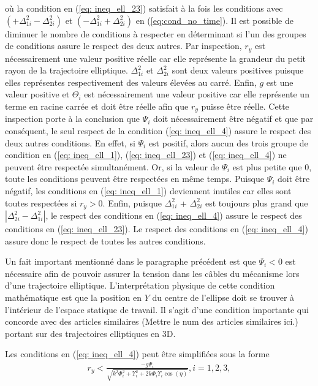 où la condition en (\ref{eq: ineq_ell_23}) satisfait à la fois les conditions avec $\left(+\Delta_{1i}^2 - \Delta_{2i}^2\right)$ et $\left(- \Delta_{1i}^2 + \Delta_{2i}^2\right)$ en (\ref{eq:cond_no_time}). Il est possible de diminuer le nombre de conditions à respecter  en déterminant si l'un des groupes de conditions assure le respect des deux autres. Par inspection, $r_y$ est nécessairement une valeur positive réelle car elle représente la grandeur du petit rayon de la trajectoire elliptique. $\Delta_{1i}^2$ et $\Delta_{2i}^2$ sont deux valeurs positives puisque elles représentes respectivement des valeurs élevées au carré. Enfin, $g$ est une valeur positive et $\Theta_i$ est nécessairement une valeur positive car elle représente un terme en racine carrée et doit être réelle afin que $r_y$ puisse être réelle. Cette inspection porte à la conclusion que $\Psi_i$ doit nécessairement être négatif et que par conséquent, le seul respect de la  condition (\ref{eq: ineq_ell_4}) assure le respect des deux autres conditions. En effet, si $\Psi_i$ est positif, alors aucun des trois groupe de condition en (\ref{eq: ineq_ell_1}), (\ref{eq: ineq_ell_23}) et (\ref{eq: ineq_ell_4}) ne peuvent être respectée simultanément. Or, si la valeur de $\Psi_i$ est plus petite que 0, toute les conditions peuvent être respectées en même temps. Puisque $\Psi_i$ doit être négatif, les conditions en (\ref{eq: ineq_ell_1}) deviennent inutiles car elles sont toutes respectées si $r_y>0$. Enfin, puisque $\Delta_{1i}^2$ + $\Delta_{2i}^2$ est toujours plus grand que $\left|\Delta_{2i}^2 - \Delta_{1i}^2\right|$, le respect des conditions en (\ref{eq: ineq_ell_4}) assure le respect des conditions en  (\ref{eq: ineq_ell_23}). Le respect des conditions en (\ref{eq: ineq_ell_4}) assure donc le respect de toutes les autres conditions. \par
Un fait important mentionné dans le paragraphe précédent est que $\Psi_i<0$ est nécessaire afin de pouvoir assurer la tension dans les câbles du mécanisme lors d'une trajectoire elliptique. L'interprétation physique de cette condition mathématique est que la position en $Y$ du centre de l'ellipse doit se trouver à l'intérieur de l'espace statique de travail. Il s'agit d'une condition importante qui concorde avec des articles similaires (Mettre le num des articles similaires ici.) portant sur des trajectoires elliptiques en 3D.\par
Les conditions en (\ref{eq: ineq_ell_4}) peut être simplifiées sous la forme 
\begin{align}
 r_y < \frac{-g\Psi_i}{\sqrt{k^2\Phi_i^2 + \Upsilon_i^2 + 2k\Phi_i\Upsilon_i\cos(\eta)}}, i = 1,2,3,\label{eq:ineq_simp}
\end{align}
